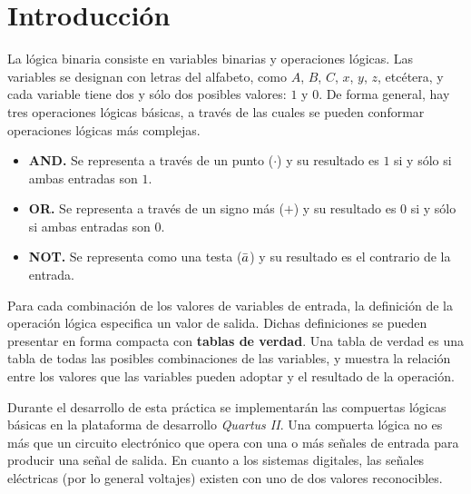 \documentclass[../main.tex]{subfiles}
\begin{document}
\clearpage
\section{Introducción}
La lógica binaria consiste en variables binarias y operaciones lógicas. Las 
variables se designan con letras del alfabeto, como $A$, $B$, $C$, $x$, $y$, 
$z$, etcétera, y cada variable tiene dos y sólo dos posibles valores: $1$ y 
$0$.  De forma general, hay tres operaciones lógicas básicas, a través de las 
cuales se pueden conformar operaciones lógicas más complejas.
\begin{itemize}
  \item \textbf{AND.} Se representa a través de un punto ($\cdot$) y su 
    resultado es $1$ si y sólo si ambas entradas son $1$.
  \item \textbf{OR.} Se representa a través de un signo más ($+$) y su 
    resultado es $0$ si y sólo si ambas entradas son $0$.
  \item \textbf{NOT.} Se representa como una testa ($\bar{a}$) y su resultado 
    es el contrario de la entrada.
\end{itemize}

Para cada combinación de los valores de variables de entrada, la definición de 
la operación lógica especifica un valor de salida. Dichas definiciones se 
pueden presentar en forma compacta con \textbf{tablas de verdad}. Una tabla de 
verdad es una tabla de todas las posibles combinaciones de las variables,  y 
muestra la relación entre los valores que las variables pueden adoptar y el 
resultado de la operación.

Durante el desarrollo de esta práctica se implementarán las compuertas lógicas 
básicas en la plataforma de desarrollo \textit{Quartus II}. Una compuerta 
lógica no es más que un circuito electrónico que opera con una o más señales 
de entrada para producir una señal de salida. En cuanto a los sistemas 
digitales, las señales eléctricas (por lo general voltajes) existen con uno de 
dos valores reconocibles.
\end{document}
